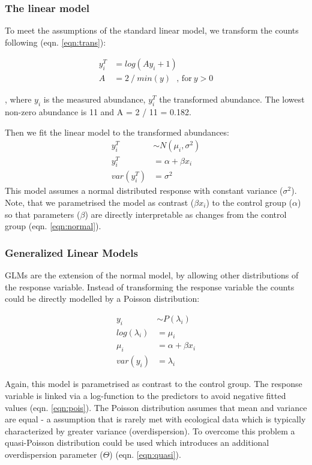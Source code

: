 \documentclass{scrartcl}
\begin{document}
\subsubsection{The linear model}
To meet the assumptions of the standard linear model, we transform the counts following \citet{van_den_brink_impact_2000} (eqn. \ref{eqn:trans}):

\begin{align}
  y^T_i & = log(Ay_i + 1) \label{eqn:trans} \\
  A & = 2~/~min(y)~~~\text{, for}~ y > 0 \nonumber
\end{align}

, where $y_i$ is the measured abundance, $y_i^T$ the transformed abundance. The lowest non-zero abundance is 11 and  A = 2 / 11 = 0.182.

Then we fit the linear model to the transformed abundances:
\begin{align}
  y_i^T &\sim N(\mu_i, \sigma^2) \nonumber \\
  y_i^T &= \alpha + \beta x_i \label{eqn:normal} \\
  var(y_i^T) &= \sigma^2 \nonumber
\end{align}
This model assumes a normal distributed response with constant variance ($\sigma^2$).
Note, that we parametrised the model as contrast ($\beta x_i$) to the control group ($\alpha$) so that parameters ($\beta$) are directly interpretable as changes from the control group (eqn. \ref{eqn:normal}).


\subsubsection{Generalized Linear Models}
GLMs are the extension of the normal model, by allowing other distributions of the response variable.
Instead of transforming the response variable the counts could be directly modelled by a Poisson distribution:

\begin{align}
  y_i &\sim P(\lambda_i) \nonumber \\
  log(\lambda_i) &= \mu_i \label{eqn:pois} \\
  \mu_i &= \alpha + \beta x_i \nonumber \\
  var(y_i) &= \lambda_i \nonumber
\end{align}

Again, this model is parametrised as contrast to the control group. 
The response variable is linked via a log-function to the predictors to avoid negative fitted values (eqn. \ref{eqn:pois}). 
The Poisson distribution assumes that mean and variance are equal - a assumption that is rarely met with ecological data which is typically characterized by greater variance (overdispersion).
To overcome this problem a quasi-Poisson distribution could be used which introduces an additional overdispersion parameter ($\Theta$) (eqn. \ref{eqn:quasi}).
\end{document}
